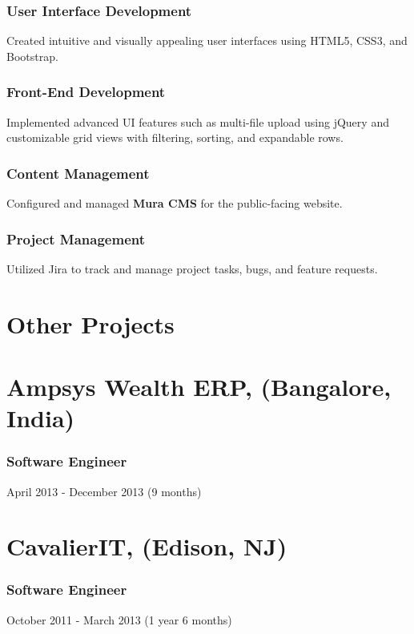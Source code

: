\documentclass[letterpaper,9pt]{article}
\begin{document}
	\subsubsection{User Interface Development}{Created intuitive and visually appealing user interfaces using HTML5, CSS3, and Bootstrap.}
	\subsubsection{Front-End Development}{Implemented advanced UI features such as multi-file upload using jQuery and customizable grid views with filtering, sorting, and expandable rows.}
	\subsubsection{Content Management}{Configured and managed \textbf{Mura CMS} for the public-facing website.}
	\subsubsection{Project Management}{Utilized Jira to track and manage project tasks, bugs, and feature requests.}
	
	\pagebreak

    \section{Other Projects}

    
    \section{Ampsys Wealth ERP, (Bangalore, India)}
    \subsubsection{Software Engineer}{April 2013 - December 2013 (9 months)}

    
    \section{CavalierIT, (Edison, NJ)}
    \subsubsection{Software Engineer}{October 2011 - March 2013 (1 year 6 months)}
\end{document}
